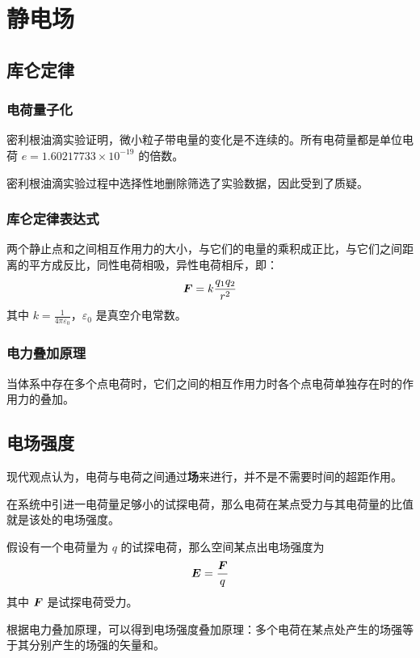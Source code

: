 \section{静电场}

\subsection{库仑定律}

\subsubsection{电荷量子化}

密利根油滴实验证明，微小粒子带电量的变化是不连续的。所有电荷量都是单位电荷 $e = 1.60217733 \times 10^{-19}$ 的倍数。

密利根油滴实验过程中选择性地删除筛选了实验数据，因此受到了质疑。

\subsubsection{库仑定律表达式}

两个静止点和之间相互作用力的大小，与它们的电量的乘积成正比，与它们之间距离的平方成反比，同性电荷相吸，异性电荷相斥，即：
$$
\boldsymbol{F} = k \frac{q_1 q_2}{r^2}
$$
其中 $k = \frac{1}{4 \pi \varepsilon_0}$，$\varepsilon_0$ 是真空介电常数。

\subsubsection{电力叠加原理}

当体系中存在多个点电荷时，它们之间的相互作用力时各个点电荷单独存在时的作用力的叠加。

\subsection{电场强度}

现代观点认为，电荷与电荷之间通过\textbf{场}来进行，并不是不需要时间的超距作用。

在系统中引进一电荷量足够小的试探电荷，那么电荷在某点受力与其电荷量的比值就是该处的电场强度。

\begin{definition}[电场强度]
	假设有一个电荷量为 $q$ 的试探电荷，那么空间某点出电场强度为
	$$
	\boldsymbol{E} = \frac{\boldsymbol{F}}{q}
	$$
	其中 $\boldsymbol{F}$ 是试探电荷受力。
\end{definition}

根据电力叠加原理，可以得到电场强度叠加原理：多个电荷在某点处产生的场强等于其分别产生的场强的矢量和。

